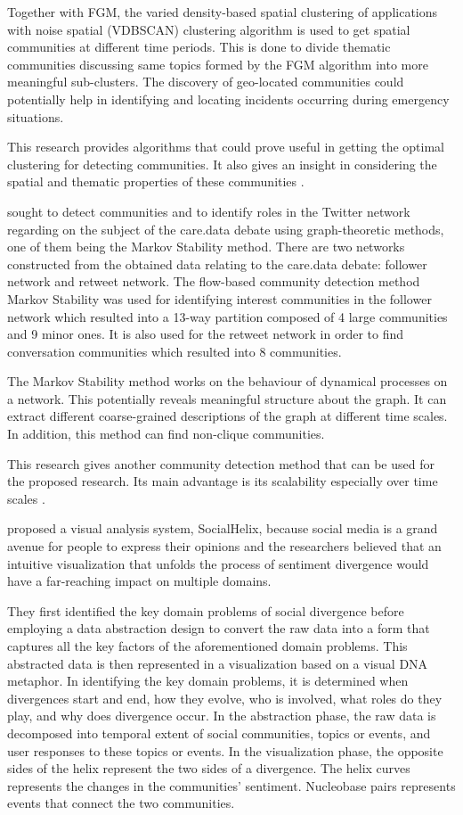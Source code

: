 Together with FGM, the varied density-based spatial clustering of applications with noise spatial (VDBSCAN) clustering algorithm is used to get spatial communities at different time periods. This is done to divide thematic communities discussing same topics formed by the FGM algorithm into more meaningful sub-clusters. The discovery of geo-located communities could potentially help in identifying and locating incidents occurring during emergency situations.

This research provides algorithms that could prove useful in getting the optimal clustering for detecting communities. It also gives an insight in considering the spatial and thematic properties of these communities \cite{Bakillah:2014}.

 sought to detect communities and to identify roles in the Twitter network regarding on the subject of the care.data debate using graph-theoretic methods, one of them being the Markov Stability method. There are two networks constructed from the obtained data relating to the care.data debate: follower network and retweet network. The flow-based community detection method Markov Stability was used for identifying interest communities in the follower network which resulted into a 13-way partition composed of 4 large communities and 9 minor ones. It is also used for the retweet network in order to find conversation communities which resulted into 8 communities. 

The Markov Stability method works on the behaviour of dynamical processes on a network. This potentially reveals meaningful structure about the graph. It can extract different coarse-grained descriptions of the graph at different time scales. In addition, this method can find non-clique communities.

This research gives another community detection method that can be used for the proposed research. Its main advantage is its scalability especially over time scales \cite{Amor:2015}.

 proposed a visual analysis system, SocialHelix, because social media is a grand avenue for people to express their opinions and the researchers believed that an intuitive visualization that unfolds the process of sentiment divergence would have a far-reaching impact on multiple domains. 

They first identified the key domain problems of social divergence before employing a data abstraction design to convert the raw data into a form that captures all the key factors of the aforementioned domain problems. This abstracted data is then represented in a visualization based on a visual DNA metaphor. In identifying the key domain problems, it is determined when divergences start and end, how they evolve, who is involved, what roles do they play, and why does divergence occur. In the abstraction phase, the raw data is decomposed into temporal extent of social communities, topics or events, and user responses to these topics or events. In the visualization phase, the opposite sides of the helix represent the two sides of a divergence. The helix curves represents the changes in the communities’ sentiment. Nucleobase pairs represents events that connect the two communities. 

